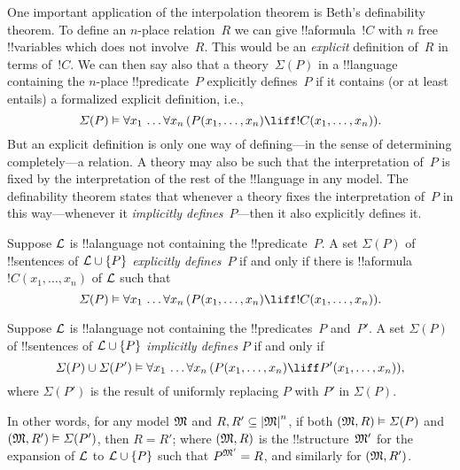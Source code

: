 \documentclass[../../../include/open-logic-section]{subfiles}
\begin{document}


One important application of the interpolation theorem is Beth's
definability theorem.  To define an $n$-place relation~$R$ we can give
!!a{formula}~$!C$ with $n$ free !!{variable}s which does not
involve~$R$. This would be an \emph{explicit} definition of~$R$ in
terms of~$!C$.  We can then say also that a theory~$\Sigma(P)$ in a
!!{language} containing the $n$-place !!{predicate}~$P$ explicitly
defines~$P$ if it contains (or at least entails) a formalized explicit
definition, i.e.,
\[
\Sigma(P) \Entails \lforall[x_1][\dots
  \lforall[x_n][(\Atom{P}{x_1,\dots, x_n} \liff !C(x_1, \dots,
    x_n))]].
\]
But an explicit definition is only one way of defining---in the sense
of determining completely---a relation.  A theory may also be such
that the interpretation of~$P$ is fixed by the interpretation of the
rest of the !!{language} in any model.  The definability theorem
states that whenever a theory fixes the interpretation of~$P$ in this
way---whenever it \emph{implicitly defines}~$P$---then it also
explicitly defines it.

\begin{defn}
Suppose $\Lang{L}$ is !!a{language} not containing the
!!{predicate}~$P$.  A set $\Sigma(P)$ of !!{sentence}s of $\Lang{L}
\cup \{P\}$ \emph{explicitly defines}~$P$ if and only if there is
!!a{formula}~$!C(x_1, \dots, x_n)$ of $\Lang{L}$ such that
\[
\Sigma(P) \Entails \lforall[x_1][\dots
  \lforall[x_n][(\Atom{P}{x_1,\dots, x_n} \liff !C(x_1, \dots,
    x_n))]].
\]
\end{defn}

\begin{defn}
Suppose $\Lang{L}$ is !!a{language} not containing the
!!{predicate}s~$P$ and~$P'$.  A set $\Sigma(P)$ of !!{sentence}s of
$\Lang{L} \cup \{P\}$ \emph{implicitly defines} $P$ if and only if
\[
\Sigma(P) \cup \Sigma(P') \Entails \lforall[x_1][\dots
  \lforall[x_n][(\Atom{P}{x_1,\dots, x_n} \liff \Atom{P'}{x_1,\dots,
      x_n})]],
\]
where $\Sigma(P')$ is the result of uniformly replacing $P$ with $P'$
in $\Sigma(P)$.
\end{defn}

In other words, for any model $\Struct{M}$ and $R, R' \subseteq
\Domain{M}^n$, if both $\Expan{M}{R} \Entails \Sigma(P)$ and
$\Expan{M}{R'} \Entails \Sigma(P')$, then $R=R'$; where
$\Expan{M}{R}$ is the !!{structure}~$\Struct{M'}$ for the
expansion of $\Lang{L}$ to $\Lang{L} \cup \{P\}$ such that
$\Assign{P}{M'} = R$, and similarly for $\Expan{M}{R'}$.
\end{document}
